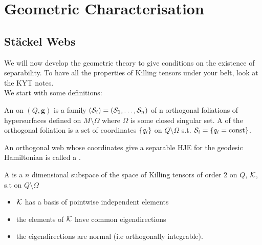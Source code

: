 \documentclass{article}
\begin{document}
\section{Geometric Characterisation}

\subsection{St\"ackel Webs}

We will now develop the geometric theory to give conditions on the existence of separability. To have all the properties of Killing tensors under your belt, look at the KYT notes. \\
We start with some definitions:

\begin{definition}
An  on $(Q,\bm{g})$ is a family $(\mathcal{S}_i) = (\mathcal{S}_1, \dots, \mathcal{S}_n)$ of n orthogonal foliations of hypersurfaces defined on $M\setminus \Omega$ where $\Omega$ is some closed singular set. A  of the orthogonal foliation is a set of coordinates $\left\{ q_i \right\}$ on $Q\setminus \Omega$ s.t. $\mathcal{S}_i = \left\{ q_i = \text{const} \right\}$.
\end{definition}

\begin{definition}
An orthogonal web whose coordinates give a separable HJE for the geodesic Hamiltonian is called a .
\end{definition}

\begin{definition}
A  is a $n$ dimensional subspace of the space of Killing tensors of order 2 on $Q$, $\mathcal{K}$, s.t on $Q\setminus \Omega$
\begin{itemize}
    \item $\mathcal{K}$ has a basis of pointwise independent elements 
    \item the elements of $\mathcal{K}$ have common eigendirections
    \item the eigendirections are normal (i.e orthogonally integrable).
\end{itemize}
\end{definition}
\end{document}
